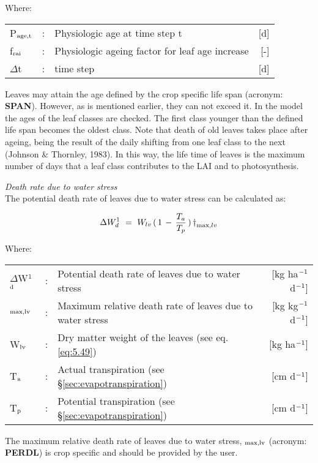 Where:\\[5pt]
\begin{tabularx}{\textwidth}{llXr}
	P$_{{\rm age,t}}$ &:& Physiologic age at time step t & [d]\\
	f$_{{\rm rai}}$ &:& Physiologic ageing factor for leaf age increase & [-]\\
	$\Delta$t &:& time step & [d]\\
\end{tabularx}

Leaves may attain the age defined by the crop specific life span (acronym: {\bf SPAN}).
However, as is mentioned earlier, they can not exceed it. In the model the ages of the
leaf classes are checked. The first class younger than the defined life span becomes the
oldest class. Note that death of old leaves takes place after ageing, being the result of the
daily shifting from one leaf class to the next (Johnson \& Thornley, 1983). In this way,
the life time of leaves is the maximum number of days that a leaf class contributes to the
LAI and to photosynthesis.

{\it Death rate due to water stress}\\
The potential death rate of leaves due to water stress can be calculated as:

\begin{equation}
\Delta W_{d}^{1} ~=~ W_{lv} \, (\, 1\, -\,{\frac{T _{a} }{T _{p} }} \, )\, {\rm \dag } _{\max ,lv} 
\end{equation}

Where:\\[5pt]
\begin{tabularx}{\textwidth}{llXr}
	$\Delta$W$^{{\rm 1}}$$_{{\rm d}}$ &:& Potential death rate of leaves due to water stress   &
	[kg  ha$^{{\rm -1}}$ d$^{{\rm -1}}$]\\
	\dag $_{{\rm max,lv}}$ &:& Maximum relative death rate of leaves due to
	water stress   &     [kg kg$^{{\rm -1}}$ d$^{{\rm -1}}$]\\
	W$_{{\rm lv}}$ &:& Dry matter weight of the leaves (see eq. \ref{eq:5.49})  &
	[kg ha$^{{\rm -1}}$]\\
	T$_{{\rm a}}$ &:& Actual transpiration (see \S \ref{sec:evapotranspiration})    &
	[cm d$^{{\rm -1}}$]\\
	T$_{{\rm p}}$ &:& Potential transpiration (see \S \ref{sec:evapotranspiration})   &
	[cm d$^{{\rm -1}}$]\\
\end{tabularx}

The maximum relative death rate of leaves due to water stress, {\bf \dag $_{{\rm max,lv}}$} 
(acronym: {\bf PERDL}) is crop specific and should be provided by the user.

